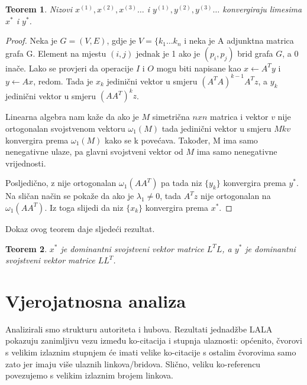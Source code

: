 \documentclass[11pt]{article}
\newtheorem{theorem}{Teorem}[section]
\begin{document}
\begin{theorem}
Nizovi $x^{(1)}, x^{(2)}, x^{(3)}\dots$ i $y^{(1)}, y^{(2)}, y^{(3)}\dots$ konvergiraju limesima $x^{*}$ i $y^{*}$.
\end{theorem}
\begin{proof}
Neka je $G = (V, E)$, gdje je $V = \{k_1 \ldots k_{n}$ i neka je A adjunktna matrica grafa G. Element na mjestu $(i,j)$ jednak je 1 ako je $(p_{i}, p_{j})$ brid grafa $G$, a 0 inače. Lako se provjeri da operacije $I$ i $O$ mogu biti napisane kao $x \leftarrow A^{T}y$ i $y \leftarrow Ax$, redom. Tada je $x_{k}$ jedinični vektor u smjeru $(A^{T}A)^{k-1}A^{T}z$, a $y_{k}$ jedinični vektor u smjeru $(AA^{T})^{k}z$.

Linearna algebra nam kaže da ako je $M$ simetrična $nxn$ matrica i vektor $v$ nije ortogonalan svojstvenom vektoru $\omega_{1}(M)$ tada jedinični vektor u smjeru $M{k}v$ konvergira prema $\omega_{1}(M)$ kako se k povećava. Također, M ima samo nenegativne ulaze, pa glavni svojstveni vektor od $M$ ima samo nenegativne vrijednosti.

Posljedično, z nije ortogonalan $\omega_{1}(AA^{T})$ pa tada niz $\{y_{k}\}$ konvergira prema $y^{*}$.
Na sličan način se pokaže da ako je $\lambda_{1} \neq 0$, tada $A^{T}z$ nije ortogonalan na $\omega_{1}(AA^{T})$. Iz toga slijedi da niz $\{x_{k}\}$ konvergira prema $x^{*}$.
\end{proof}

Dokaz ovog teorem daje sljedeći rezultat.
\begin{theorem}
$x^{*}$ je dominantni svojstveni vektor matrice $L^{T}L$, a $y^{*}$ je dominantni svojstveni vektor matrice $LL^{T}$.
\end{theorem}

\newpage
\section{Vjerojatnosna analiza}
Analizirali smo strukturu autoriteta i hubova. Rezultati jednadžbe LALA pokazuju zanimljivu vezu između ko-citacija i stupnja ulaznosti: općenito, čvorovi s velikim izlaznim stupnjem će imati velike ko-citacije s ostalim čvorovima samo zato jer imaju više ulaznih linkova/bridova. Slično, veliku ko-referencu povezujemo s velikim izlaznim brojem linkova.
\end{document}
